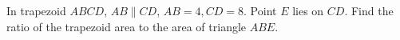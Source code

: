 In trapezoid $ABCD$, $AB\parallel CD$, $AB=4,CD=8$. Point $E$ lies on $CD$. Find the ratio of the trapezoid area to the area of triangle $ABE$.
